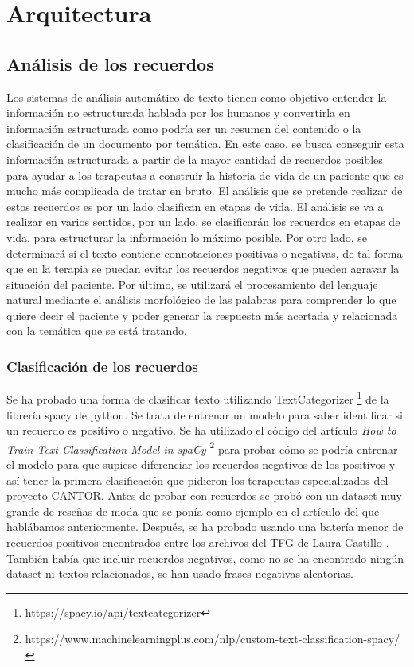 \chapter{Arquitectura}
\label{cap:arquitectura}

\section{Análisis de los recuerdos}

Los sistemas de análisis automático de texto tienen como objetivo entender la información no estructurada hablada por los humanos y convertirla en información estructurada como podría ser un resumen del contenido o la clasificación de un documento por temática. En este caso, se busca conseguir esta información estructurada a partir de la mayor cantidad de recuerdos posibles para ayudar a los terapeutas a construir la historia de vida de un paciente que es mucho más complicada de tratar en bruto. El análisis que se pretende realizar de estos recuerdos es por un lado clasifican en etapas de vida. El análisis se va a realizar en varios sentidos, por un lado, se clasificarán los recuerdos en etapas de vida, para estructurar la información lo máximo posible. Por otro lado, se determinará si el texto contiene connotaciones positivas o negativas, de tal forma que en la terapia se puedan evitar los recuerdos negativos que pueden agravar la situación del paciente. Por último, se utilizará el procesamiento del lenguaje natural mediante el análisis morfológico de las palabras para comprender lo que quiere decir el paciente y poder generar la respuesta más acertada y relacionada con la temática que se está tratando. 

\subsection{Clasificación de los recuerdos}

Se ha probado una forma de clasificar texto utilizando TextCategorizer \footnote{https://spacy.io/api/textcategorizer} de la librería spacy de python. Se trata de entrenar un modelo para saber identificar si un recuerdo es positivo o negativo. Se ha utilizado el código del artículo \textit{How to Train Text Classification Model in spaCy} \footnote{https://www.machinelearningplus.com/nlp/custom-text-classification-spacy/} para probar cómo se podría entrenar el modelo para que supiese diferenciar los recuerdos negativos de los positivos y así tener la primera clasificación que pidieron los terapeutas especializados del proyecto CANTOR. Antes de probar con recuerdos se probó con un dataset muy grande de reseñas de moda que se ponía como ejemplo en el artículo del que hablábamos anteriormente. Después, se ha probado usando una batería menor de recuerdos positivos encontrados entre los archivos del TFG de Laura Castillo \citep{reminiscencia}. También había que incluir recuerdos negativos, como no se ha encontrado ningún dataset ni textos relacionados, se han usado frases negativas aleatorias.


